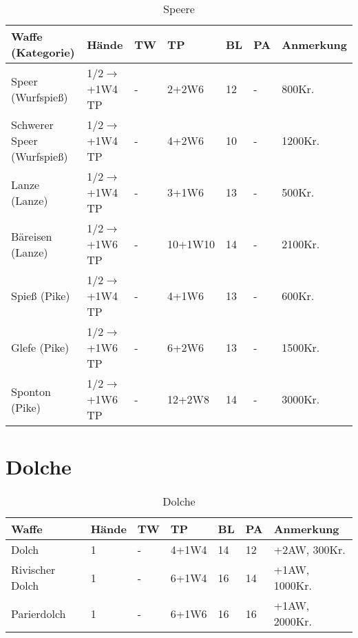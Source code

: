 \begin{table}[H]
\begin{center}
\begin{tabular}{|l|l|l|l|l|l|p{2.5cm}|}
\hline
\textbf{Waffe (Kategorie)} & \textbf{Hände} & \textbf{TW} & \textbf{TP} & \textbf{BL} & \textbf{PA} & \textbf{Anmerkung} \\ \hline

Speer (Wurfspieß) & 1/2$\rightarrow$+1W4 TP & - & 2+2W6 & 12 & - & 800Kr. \\ \hline

Schwerer Speer (Wurfspieß) & 1/2$\rightarrow$+1W4 TP & - & 4+2W6 & 10 & - & 1200Kr. \\ \hline

Lanze (Lanze) & 1/2$\rightarrow$+1W4 TP & - & 3+1W6 & 13 & - & 500Kr. \\ \hline

Bäreisen (Lanze) & 1/2$\rightarrow$+1W6 TP & - & 10+1W10 & 14 & - & 2100Kr. \\ \hline

Spieß (Pike) & 1/2$\rightarrow$+1W4 TP & - & 4+1W6 & 13 & - & 600Kr. \\ \hline

Glefe (Pike) & 1/2$\rightarrow$+1W6 TP & - & 6+2W6 & 13 & - & 1500Kr. \\ \hline

Sponton (Pike) & 1/2$\rightarrow$+1W6 TP & - & 12+2W8 & 14 & - & 3000Kr. \\ \hline

\end{tabular}
\end{center}
\caption{Speere}
\label{tab:Speere}
\end{table}

\section{Dolche}
\begin{table}[H]
\begin{center}
\begin{tabular}{|l|l|l|l|l|l|p{2.5cm}|}
\hline
\textbf{Waffe} & \textbf{Hände} & \textbf{TW} & \textbf{TP} & \textbf{BL} & \textbf{PA} & \textbf{Anmerkung} \\

\hline
Dolch & 1 & - & 4+1W4 & 14 & 12 & +2AW, 300Kr. \\

\hline
Rivischer Dolch & 1 & - & 6+1W4 & 16 & 14 & +1AW, 1000Kr. \\ \hline

\hline
Parierdolch & 1 & - & 6+1W6 & 16 & 16 & +1AW, 2000Kr. \\

\hline
\end{tabular}
\end{center}
\caption{Dolche}
\label{tab:Dolche}
\end{table}


